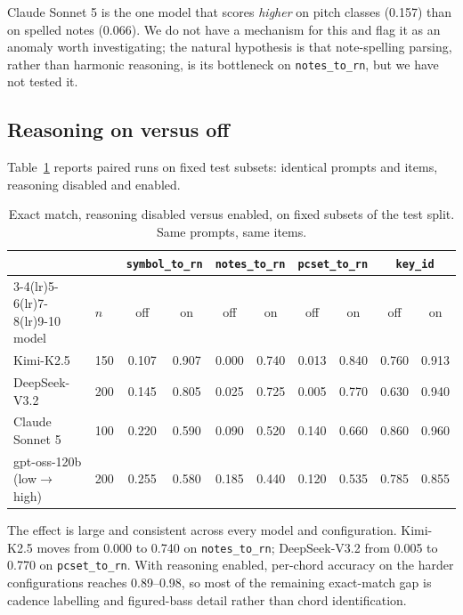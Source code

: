 \documentclass[11pt]{article}
\begin{document}
Claude Sonnet 5 is the one model that scores \emph{higher} on pitch classes
(0.157) than on spelled notes (0.066). We do not have a mechanism for this and
flag it as an anomaly worth investigating; the natural hypothesis is that
note-spelling parsing, rather than harmonic reasoning, is its bottleneck on
\texttt{notes\_to\_rn}, but we have not tested it.

\subsection{Reasoning on versus off}

Table~\ref{tab:reasoning} reports paired runs on fixed test subsets: identical
prompts and items, reasoning disabled and enabled.

\begin{table}[h]
\centering
\small
\begin{tabular}{llcccccccc}
\toprule
& & \multicolumn{2}{c}{\texttt{symbol\_to\_rn}} & \multicolumn{2}{c}{\texttt{notes\_to\_rn}} & \multicolumn{2}{c}{\texttt{pcset\_to\_rn}} & \multicolumn{2}{c}{\texttt{key\_id}} \\
\cmidrule(lr){3-4}\cmidrule(lr){5-6}\cmidrule(lr){7-8}\cmidrule(lr){9-10}
model & $n$ & off & on & off & on & off & on & off & on \\
\midrule
Kimi-K2.5     & 150 & 0.107 & 0.907 & 0.000 & 0.740 & 0.013 & 0.840 & 0.760 & 0.913 \\
DeepSeek-V3.2 & 200 & 0.145 & 0.805 & 0.025 & 0.725 & 0.005 & 0.770 & 0.630 & 0.940 \\
Claude Sonnet 5 & 100 & 0.220 & 0.590 & 0.090 & 0.520 & 0.140 & 0.660 & 0.860 & 0.960 \\
gpt-oss-120b (low$\to$high) & 200 & 0.255 & 0.580 & 0.185 & 0.440 & 0.120 & 0.535 & 0.785 & 0.855 \\
\bottomrule
\end{tabular}
\caption{Exact match, reasoning disabled versus enabled, on fixed subsets of the
test split. Same prompts, same items.}
\label{tab:reasoning}
\end{table}

The effect is large and consistent across every model and configuration. Kimi-K2.5
moves from 0.000 to 0.740 on \texttt{notes\_to\_rn}; DeepSeek-V3.2 from 0.005 to
0.770 on \texttt{pcset\_to\_rn}. With reasoning enabled, per-chord accuracy on the
harder configurations reaches 0.89--0.98, so most of the remaining exact-match
gap is cadence labelling and figured-bass detail rather than chord identification.
\end{document}

